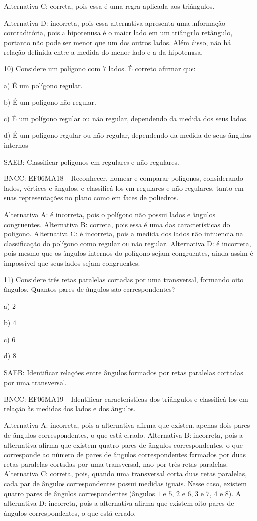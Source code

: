 Alternativa C: correta, pois essa é uma regra aplicada aos triângulos.

Alternativa D: incorreta, pois essa alternativa apresenta uma informação
contraditória, pois a hipotenusa é o maior lado em um triângulo
retângulo, portanto não pode ser menor que um dos outros lados. Além
disso, não há relação definida entre a medida do menor lado e a da
hipotenusa.

10) Considere um polígono com $7$ lados. É correto afirmar que:

a) É um polígono regular.

b) É um polígono não regular.

c) É um polígono regular ou não regular, dependendo da medida dos seus
lados.

d) É um polígono regular ou não regular, dependendo da medida de seus
ângulos internos

SAEB: Classificar polígonos em regulares e não regulares.

BNCC: EF06MA18 -- Reconhecer, nomear e comparar polígonos, considerando
lados, vértices e ângulos, e classificá-los em regulares e não
regulares, tanto em suas representações no plano como em faces de
poliedros.

Alternativa A: é incorreta, pois o polígono não possui lados e ângulos
congruentes. Alternativa B: correta, pois essa é uma das características
do polígono. Alternativa C: é incorreta, pois a medida dos lados não
influencia na classificação do polígono como regular ou não regular.
Alternativa D: é incorreta, pois mesmo que os ângulos internos do
polígono sejam congruentes, ainda assim é impossível que seus lados
sejam congruentes.

11) Considere três retas paralelas cortadas por uma transversal,
formando oito ângulos. Quantos pares de ângulos são correspondentes?

a) $2$

b) $4$

c) $6$

d) $8$

SAEB: Identificar relações entre ângulos formados por retas paralelas
cortadas por uma transversal.

BNCC: EF06MA19 -- Identificar características dos triângulos e
classificá-los em relação às medidas dos lados e dos ângulos.

Alternativa A: incorreta, pois a alternativa afirma que existem apenas
dois pares de ângulos correspondentes, o que está errado. Alternativa B:
incorreta, pois a alternativa afirma que existem quatro pares de ângulos
correspondentes, o que corresponde ao número de pares de ângulos
correspondentes formados por duas retas paralelas cortadas por uma
transversal, não por três retas paralelas. Alternativa C: correta, pois,
quando uma transversal corta duas retas paralelas, cada par de ângulos
correspondentes possui medidas iguais. Nesse caso, existem quatro pares
de ângulos correspondentes (ângulos $1$ e $5$, $2$ e $6$, $3$ e $7$, $4$ e $8$). A
alternativa D: incorreta, pois a alternativa afirma que existem oito
pares de ângulos correspondentes, o que está errado.

